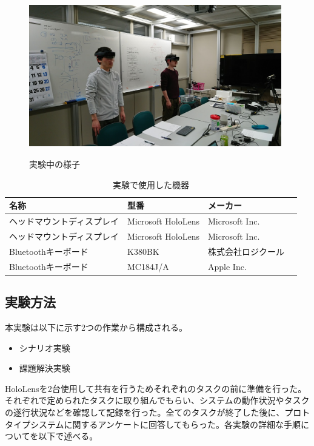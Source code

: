 \documentclass[11pt,a4j, titlepage]{jarticle} %
\begin{document}
\begin{figure}[H]
  \begin{center}
    \includegraphics[clip,height=7.0cm,width=11.0cm]{./jikkenchu.eps}
    \caption{実験中の様子}
    \label{fig:jikkenchu}
  \end{center}
\end{figure}

\begin{table}[H]
\caption{実験で使用した機器}
\label{table:jikken_kiki}
\begin{center}
\begin{tabular}{|l|l|l|}
\hline
名称 & 型番 & メーカー \\
\hline\hline
ヘッドマウントディスプレイ & Microsoft HoloLens & Microsoft Inc. \\
\hline
ヘッドマウントディスプレイ & Microsoft HoloLens & Microsoft Inc. \\
\hline
Bluetoothキーボード & K380BK & 株式会社ロジクール　\\
\hline
Bluetoothキーボード & MC184J/A & Apple Inc. \\
\hline
\end{tabular}
\end{center}
\end{table}

\subsection{実験方法}
本実験は以下に示す2つの作業から構成される。

\begin{itemize}
 \item シナリオ実験
 \item 課題解決実験
\end{itemize}

HoloLensを2台使用して共有を行うためそれぞれのタスクの前に準備を行った。それぞれで定められたタスクに取り組んでもらい、システムの動作状況やタスクの遂行状況などを確認して記録を行った。全てのタスクが終了した後に、プロトタイプシステムに関するアンケートに回答してもらった。各実験の詳細な手順についてを以下で述べる。
\end{document}
